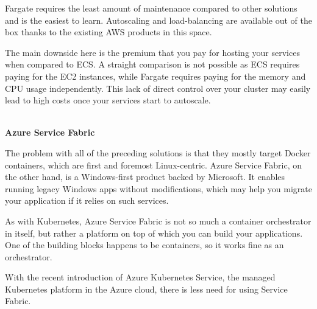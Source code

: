 Fargate requires the least amount of maintenance compared to other solutions and is the easiest to learn. Autoscaling and load-balancing are available out of the box thanks to the existing AWS products in this space.

The main downside here is the premium that you pay for hosting your services when compared to ECS. A straight comparison is not possible as ECS requires paying for the EC2 instances, while Fargate requires paying for the memory and CPU usage independently. This lack of direct control over your cluster may easily lead to high costs once your services start to autoscale.

\hspace*{\fill} \\ %
\noindent
\textbf{Azure Service Fabric}

The problem with all of the preceding solutions is that they mostly target Docker containers, which are first and foremost Linux-centric. Azure Service Fabric, on the other hand, is a Windows-first product backed by Microsoft. It enables running legacy Windows apps without modifications, which may help you migrate your application if it relies on such services.

As with Kubernetes, Azure Service Fabric is not so much a container orchestrator in itself, but rather a platform on top of which you can build your applications. One of the building blocks happens to be containers, so it works fine as an orchestrator.

With the recent introduction of Azure Kubernetes Service, the managed Kubernetes platform in the Azure cloud, there is less need for using Service Fabric.








